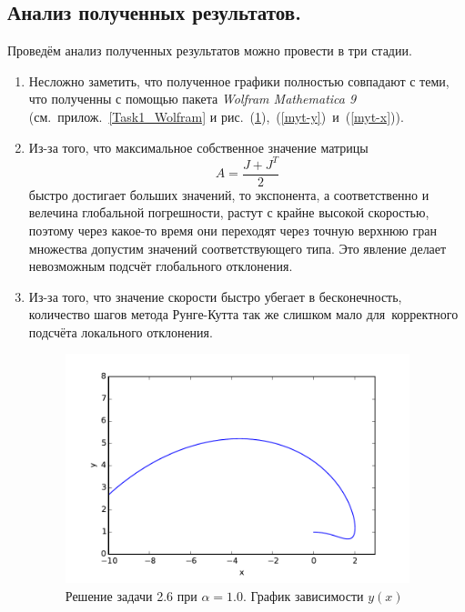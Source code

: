 \documentclass[a4paper,14pt]{article}
\begin{document}
\subsection{Анализ полученных результатов.}
Проведём анализ полученных результатов можно провести в три стадии.
\begin{enumerate}
\item Несложно заметить, что полученное графики полностью совпадают с теми, что полученны с помощью пакета {\it Wolfram Mathematica 9} (см.~прилож.~\ref{Task1_Wolfram} и рис.~(\ref{myx-y}),~(\ref{myt-y})~и~(\ref{myt-x})).
\item Из-за того, что максимальное собственное значение матрицы
\[
A = \frac{J + J^T}{2}
\]
быстро достигает больших значений, то экспонента, а соответственно и велечина глобальной погрешности, растут с крайне высокой скоростью, поэтому через какое-то время они переходят через точную верхнюю гран множества допустим значений соответствующего типа. Это явление делает невозможным подсчёт глобального отклонения. 
\item Из-за того, что значение скорости быстро убегает в бесконечность, количество шагов метода Рунге-Кутта так же слишком мало для~корректного подсчёта локального отклонения.

\begin{figure}[H]
\noindent{}
\end{figure}
\begin{figure}[H]
\centering
    \includegraphics[width=100mm]{pictures/10x-y.pdf}
    \caption{Решение задачи 2.6 при $\alpha = 1.0$. График зависимости $y(x)$}
    \label{myx-y}
\end{figure}
\end{enumerate}
\end{document}
